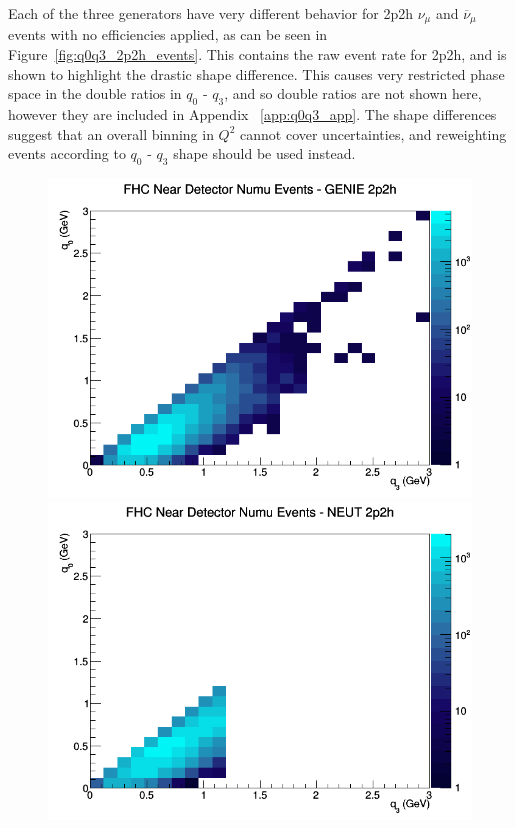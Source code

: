 \documentclass[12pt]{article}
\begin{document}
Each of the three generators have very different behavior for 2p2h $\nu_\mu$ and $\overline{\nu}_{\mu}$ events with no efficiencies applied, as can be seen in Figure~\ref{fig:q0q3_2p2h_events}. This contains the raw event rate for 2p2h, and is shown to highlight the drastic shape difference. This causes very restricted phase space in the double ratios in $q_0 \textrm{ - } q_3$, and so double ratios are not shown here, however they are included in Appendix ~\ref{app:q0q3_app}. The shape differences suggest that an overall binning in $Q^2$ cannot cover uncertainties, and reweighting events according to $q_0 \textrm{ - } q_3$ shape should be used instead.
\begin{figure}[h]
\centering
{}
\includegraphics[width=\linewidth]{q0_q3/nominal/2p2h_FHC_ND_numu_q3_q0_GENIE.png}
\endminipage
{}
\includegraphics[width=\linewidth]{q0_q3/nominal/2p2h_FHC_ND_numu_q3_q0_NEUT.png}

\end{figure}
\end{document}
